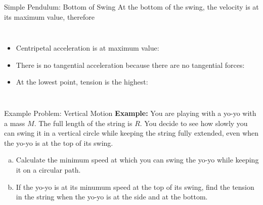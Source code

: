 \documentclass[12pt,compress,aspectratio=169]{beamer}
\begin{document}
\begin{frame}{Simple Pendulum: Bottom of Swing}
  At the bottom of the swing, the velocity is at its maximum value,
  therefore
  \vspace{.1in}\begin{columns}

    \begin{itemize}
    \item Centripetal acceleration is at maximum value:

    \item There is no tangential acceleration because there are no tangential
      forces:

    \item At the lowest point, tension is the highest:

    \end{itemize}
  \end{columns}
\end{frame}



\begin{frame}{Example Problem: Vertical Motion}
  \textbf{Example:} You are playing with a yo-yo with a mass $M$. The full
  length of the string is $R$. You decide to see how slowly you can swing it in
  a vertical circle while keeping the string fully extended, even when the
  yo-yo is at the top of its swing.
  \begin{enumerate}[a.]
  \item Calculate the minimum speed at which you can swing the yo-yo while
    keeping it on a circular path.
  \item If the yo-yo is at its minumum speed at the top of its swing, find the
    tension in the string when the yo-yo is at the side and at the bottom.
  \end{enumerate}
\end{frame}
\end{document}
